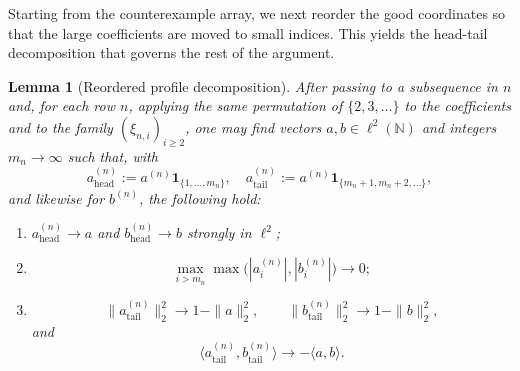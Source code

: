 \documentclass[11pt]{amsart}
\newtheorem{lemma}[theorem]{Lemma}
\newcommand{\N}{\mathbb N}
\begin{document}
Starting from the counterexample array, we next reorder the good coordinates so
that the large coefficients are moved to small indices. This yields the
head-tail decomposition that governs the rest of the argument.

\begin{lemma}[Reordered profile decomposition]\label{lem:profile}
After passing to a subsequence in $n$ and, for each row $n$, applying the same
permutation of $\{2,3,\dots\}$ to the coefficients and to the family
$(\xi_{n,i})_{i \ge 2}$, one may find vectors $a,b \in \ell^2(\N)$ and
integers $m_n \to \infty$ such that, with
\[
a^{(n)}_{\mathrm{head}} := a^{(n)} \mathbf{1}_{\{1,\dots,m_n\}},
\quad
a^{(n)}_{\mathrm{tail}} := a^{(n)} \mathbf{1}_{\{m_n+1,m_n+2,\dots\}},
\]
and likewise for $b^{(n)}$, the following hold:
\begin{enumerate}[label=\rm(\arabic*)]
\item $a^{(n)}_{\mathrm{head}} \to a$ and
$b^{(n)}_{\mathrm{head}} \to b$ strongly in $\ell^2$;
\item
\[
\max_{i > m_n} \max\bigl( |a_i^{(n)}|, |b_i^{(n)}| \bigr) \longrightarrow 0;
\]
\item
\[
\|a^{(n)}_{\mathrm{tail}}\|_2^2 \longrightarrow 1-\|a\|_2^2,
\qquad
\|b^{(n)}_{\mathrm{tail}}\|_2^2 \longrightarrow 1-\|b\|_2^2,
\]
and
\[
\langle a^{(n)}_{\mathrm{tail}}, b^{(n)}_{\mathrm{tail}} \rangle
\longrightarrow
- \langle a,b \rangle.
\]
\end{enumerate}
\end{lemma}
\end{document}
